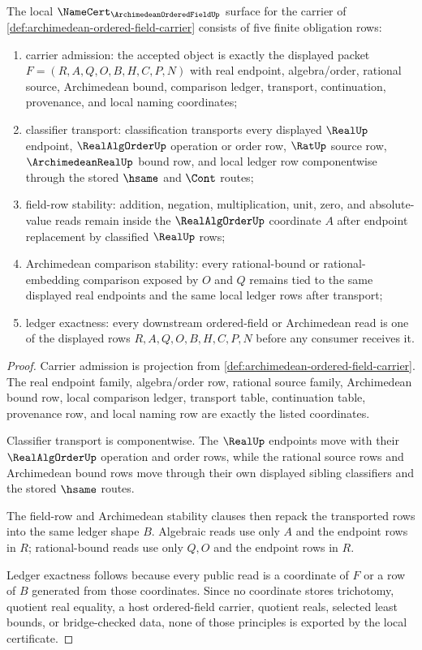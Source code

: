 \begin{theorem}
\label{thm:archimedean-ordered-field-namecert-obligations}
The local $\NameCert_{\ArchimedeanOrderedFieldUp}$ surface for the carrier of \autoref{def:archimedean-ordered-field-carrier} consists of five finite obligation rows:
\begin{enumerate}
\item carrier admission: the accepted object is exactly the displayed packet $F=(R,A,Q,O,B,H,C,P,N)$ with real endpoint, algebra/order, rational source, Archimedean bound, comparison ledger, transport, continuation, provenance, and local naming coordinates;
\item classifier transport: classification transports every displayed $\RealUp$ endpoint, $\RealAlgOrderUp$ operation or order row, $\RatUp$ source row, $\ArchimedeanRealUp$ bound row, and local ledger row componentwise through the stored $\hsame$ and $\Cont$ routes;
\item field-row stability: addition, negation, multiplication, unit, zero, and absolute-value reads remain inside the $\RealAlgOrderUp$ coordinate $A$ after endpoint replacement by classified $\RealUp$ rows;
\item Archimedean comparison stability: every rational-bound or rational-embedding comparison exposed by $O$ and $Q$ remains tied to the same displayed real endpoints and the same local ledger rows after transport;
\item ledger exactness: every downstream ordered-field or Archimedean read is one of the displayed rows $R,A,Q,O,B,H,C,P,N$ before any consumer receives it.
\end{enumerate}
\end{theorem}
\begin{proof}
Carrier admission is projection from \autoref{def:archimedean-ordered-field-carrier}. The real endpoint family, algebra/order row, rational source family, Archimedean bound row, local comparison ledger, transport table, continuation table, provenance row, and local naming row are exactly the listed coordinates.

Classifier transport is componentwise. The $\RealUp$ endpoints move with their $\RealAlgOrderUp$ operation and order rows, while the rational source rows and Archimedean bound rows move through their own displayed sibling classifiers and the stored $\hsame$ routes.

The field-row and Archimedean stability clauses then repack the transported rows into the same ledger shape $B$. Algebraic reads use only $A$ and the endpoint rows in $R$; rational-bound reads use only $Q,O$ and the endpoint rows in $R$.

Ledger exactness follows because every public read is a coordinate of $F$ or a row of $B$ generated from those coordinates. Since no coordinate stores trichotomy, quotient real equality, a host ordered-field carrier, quotient reals, selected least bounds, or bridge-checked data, none of those principles is exported by the local certificate.
\end{proof}

